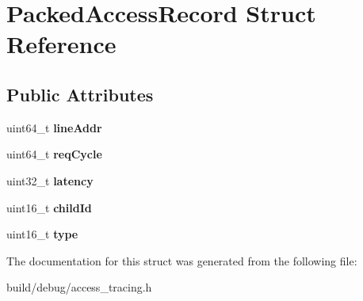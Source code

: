 \hypertarget{structPackedAccessRecord}{\section{Packed\-Access\-Record Struct Reference}
\label{structPackedAccessRecord}
}
\subsection*{Public Attributes}
\begin{DoxyCompactItemize}
\item 
\hypertarget{structPackedAccessRecord_a848174e5e0322cea4fa444f88524ee3f}{uint64\-\_\-t {\bfseries line\-Addr}}\label{structPackedAccessRecord_a848174e5e0322cea4fa444f88524ee3f}

\item 
\hypertarget{structPackedAccessRecord_a48a3894a532046f34845312bf82cc58e}{uint64\-\_\-t {\bfseries req\-Cycle}}\label{structPackedAccessRecord_a48a3894a532046f34845312bf82cc58e}

\item 
\hypertarget{structPackedAccessRecord_a7eb254c1094082471faa4edee540b94d}{uint32\-\_\-t {\bfseries latency}}\label{structPackedAccessRecord_a7eb254c1094082471faa4edee540b94d}

\item 
\hypertarget{structPackedAccessRecord_ae8c280e01a786e1b9ad2f18d21b63b42}{uint16\-\_\-t {\bfseries child\-Id}}\label{structPackedAccessRecord_ae8c280e01a786e1b9ad2f18d21b63b42}

\item 
\hypertarget{structPackedAccessRecord_a68a0c28f420ccd7b246f1322f059d62d}{uint16\-\_\-t {\bfseries type}}\label{structPackedAccessRecord_a68a0c28f420ccd7b246f1322f059d62d}

\end{DoxyCompactItemize}


The documentation for this struct was generated from the following file\-:\begin{DoxyCompactItemize}
\item 
build/debug/access\-\_\-tracing.\-h\end{DoxyCompactItemize}
